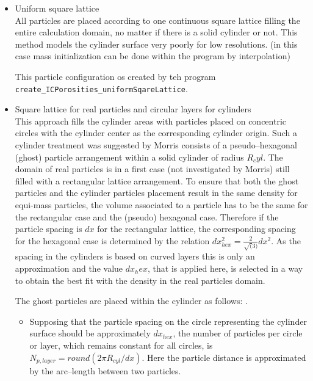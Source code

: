\documentclass[11pt,a4paper,twoside]{report}
\begin{document}
\begin{itemize}

 \item Uniform square lattice\\
  All particles are placed according to one continuous square lattice filling the entire calculation domain, no matter if there is a solid cylinder or not. This method  models the cylinder surface very poorly for low resolutions. (in this case mass initialization can be done within the program by interpolation)

This particle configuration os created by teh program {\tt create\_ICPorosities\_uniformSqareLattice}.

\item Square lattice for real particles and circular layers for cylinders\\
This approach fills the cylinder areas with particles placed on concentric circles with the cylinder center as the corresponding cylinder origin.
Such a cylinder treatment was suggested by Morris \cite{Zhu1999} consists of a pseudo--hexagonal (ghost) particle arrangement within a solid cylinder of radius $R_cyl$. The domain of real particles is in a first case (not investigated by Morris) still filled with a rectangular lattice arrangement. To ensure that both the ghost particles and the cylinder particles placement result in the same density for equi-mass particles, the volume associated to a particle has to be the same for the rectangular case and the (pseudo) hexagonal case. Therefore if the particle spacing is $dx$ for the rectangular lattice, the corresponding spacing for the hexagonal case is determined by the relation $dx_\mathit{hex}^2=\frac{2}{\sqrt(3)}dx^2$. As the spacing in the cylinders is based on curved layers this is only an approximation and the value $dx_hex$, that is applied here, is selected in a way to obtain the best fit with the density in the real particles domain.

 The ghost particles are placed within the cylinder as follows:  .
  \begin{itemize}

   \item Supposing that the particle spacing on the circle representing the cylinder surface should be approximately $dx_\mathit{hex}$, the number of particles per circle or layer, which remains constant for all circles, is $N_{p,\mathit{layer}}={\mathit round}(2\pi R_\mathit{cyl}/dx)$. Here the particle distance is approximated by the arc--length between two particles.


\end{itemize}
\end{itemize}
\end{document}
